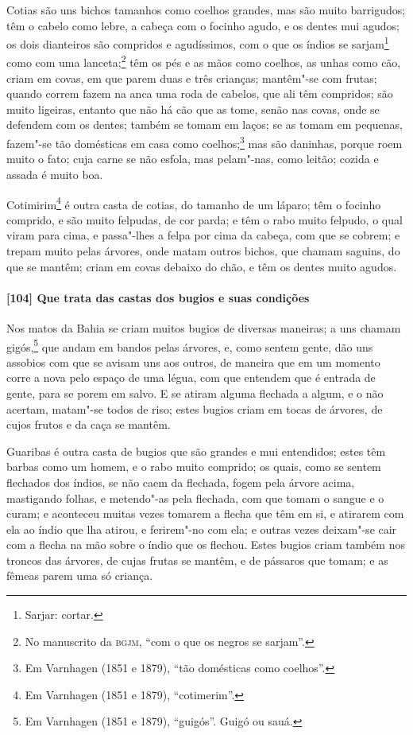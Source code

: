 Cotias são uns bichos tamanhos como coelhos grandes, mas são muito barrigudos; têm o
cabelo como lebre, a cabeça com o focinho agudo, e os dentes mui agudos; os dois
dianteiros são compridos e agudíssimos, com o que os índios se sarjam\footnote{ Sarjar:
cortar.} como com uma lanceta;\footnote{ No manuscrito da \textsc{bgjm}, ``com o que os
negros se sarjam''.} têm os pés e as mãos como coelhos, as unhas como cão, criam em covas,
em que parem duas e três crianças; mantêm"-se com frutas; quando correm fazem na anca uma
roda de cabelos, que ali têm compridos; são muito ligeiras, entanto que não há cão que as
tome, senão nas covas, onde se defendem com os dentes; também se tomam em laços; se as
tomam em pequenas, fazem"-se tão domésticas em casa como coelhos;\footnote{ Em Varnhagen
(1851 e 1879), ``tão domésticas como coelhos''.} mas são daninhas, porque roem muito o
fato; cuja carne se não esfola, mas pelam"-nas, como leitão; cozida e assada é muito boa.

Cotimirim\footnote{ Em Varnhagen (1851 e 1879), ``cotimerim''.} é outra casta de cotias,
do tamanho de um láparo; têm o focinho comprido, e são muito felpudas, de cor parda; e têm
o rabo muito felpudo, o qual viram para cima, e passa"-lhes a felpa por cima da cabeça, com
que se cobrem; e trepam muito pelas árvores, onde matam outros bichos, que chamam saguins,
do que se mantêm; criam em covas debaixo do chão, e têm os dentes muito agudos.

\paragraph{[104] Que trata das castas dos bugios e suas condições}\quad
Nos matos da Bahia se criam muitos bugios de diversas maneiras; a uns chamam
gigós,\footnote{ Em Varnhagen (1851 e 1879), ``guigós''. Guigó ou sauá.} que andam em
bandos pelas árvores, e, como sentem gente, dão uns assobios com que se avisam uns aos
outros, de maneira que em um momento corre a nova pelo espaço de uma légua, com que
entendem que é entrada de gente, para se porem em salvo. E se atiram alguma flechada a
algum, e o não acertam, matam"-se todos de riso; estes bugios criam em tocas de árvores, de
cujos frutos e da caça se mantêm.

Guaribas é outra casta de bugios que são grandes e mui entendidos; estes têm barbas como
um homem, e o rabo muito comprido; os quais, como se sentem flechados dos índios, se não
caem da flechada, fogem pela árvore acima, mastigando folhas, e metendo"-as pela flechada,
com que tomam o sangue e o curam; e aconteceu muitas vezes tomarem a flecha que têm em si,
e atirarem com ela ao índio que lha atirou, e ferirem"-no com ela; e outras vezes deixam"-se
cair com a flecha na mão sobre o índio que os flechou. Estes bugios criam também nos
troncos das árvores, de cujas frutas se mantêm, e de pássaros que tomam; e as fêmeas parem
uma só criança.

